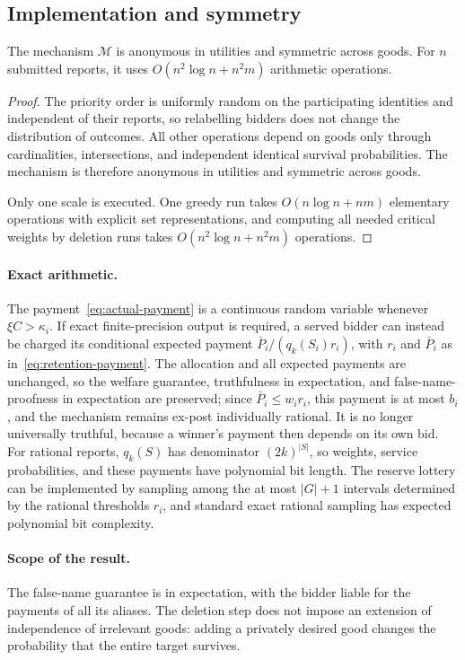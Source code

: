 \documentclass[format=acmsmall, review=false]{acmart}
\begin{document}
\subsection{Implementation and symmetry}
\label{sec:rand-implementation}

\begin{proposition}\label{prop:implementation}
The mechanism \(\mathcal M\) is anonymous in utilities and
symmetric across goods. For \(n\) submitted reports, it uses
\(O(n^2\log n+n^2m)\) arithmetic operations.
\end{proposition}

\begin{proof}
The priority order is uniformly random on the participating
identities and independent of their reports, so relabelling
bidders does not change the distribution of outcomes. All other
operations depend on goods only through cardinalities,
intersections, and independent identical survival
probabilities. The mechanism is therefore anonymous in utilities
and symmetric across goods.

Only one scale is executed. One greedy run takes
\(O(n\log n+nm)\) elementary operations with explicit set
representations, and computing all needed critical weights by
deletion runs takes \(O(n^2\log n+n^2m)\) operations.
\end{proof}

\paragraph{Exact arithmetic.}
The payment~\eqref{eq:actual-payment} is a continuous random
variable whenever \(\xi C>\kappa_i\). If exact finite-precision
output is required, a served bidder can instead be charged its
conditional expected payment
\(\bar P_i/(q_k(S_i)r_i)\), with \(r_i\) and \(\bar P_i\) as
in~\eqref{eq:retention-payment}. The allocation and all expected
payments are unchanged, so the welfare guarantee,
truthfulness in expectation, and false-name-proofness in
expectation are preserved; since
\(\bar P_i\le w_ir_i\), this payment is at most \(b_i\), and the
mechanism remains ex-post individually rational. It is no longer
universally truthful, because a winner's payment then depends on
its own bid. For rational reports, \(q_k(S)\) has denominator
\((2k)^{|S|}\), so weights, service probabilities, and these
payments have polynomial bit length. The reserve lottery can be
implemented by sampling among the at most \(|G|+1\) intervals
determined by the rational thresholds \(r_i\), and standard
exact rational sampling has expected polynomial bit complexity.

\paragraph{Scope of the result.}
The false-name guarantee is in expectation, with the bidder
liable for the payments of all its aliases. The deletion step
does not impose an extension of independence of irrelevant
goods: adding a privately desired good changes the probability
that the entire target survives.



\end{document}
